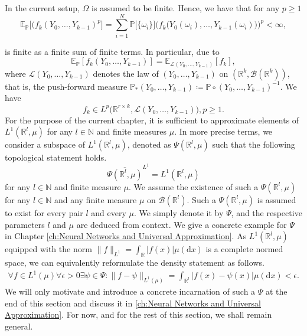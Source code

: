 \documentclass[11pt,a4paper,twoside,openany]{report}
\numberwithin{equation}{section}
\newcommand{\diff}{\mathrm{d}}
\theoremstyle{plain} %
\theoremstyle{definition} %
\theoremstyle{remark} %
\begin{document}
In the current setup, \(\Omega\) is assumed to be finite. Hence, we have that for any \(p\geq 1\)
\begin{equation*}
    \mathbb{E}_{\mathbb{P}}\big[(f_k(Y_0,\dots,Y_{k-1})^p\big]=\sum_{i=1}^N \mathbb{P}\big[\{\omega_i\}\big]\bigg(f_k\big(Y_0(\omega_i),\dots,Y_{k-1}(\omega_i)\big)\bigg)^p<\infty,
\end{equation*}

is finite as a finite sum of finite terms.
In particular, due to
\begin{equation*}
    \mathbb{E}_{\mathbb{P}}[f_k(Y_0,\dots,Y_{k-1})]=\mathbb{E}_{\mathcal{L}(Y_0,\dots,Y_{k-1})}[f_k],
\end{equation*}
where \(\mathcal{L}(Y_0,\dots,Y_{k-1})\) denotes the law of \((Y_0,\dots,Y_{k-1})\) on \((\mathbb{R}^{k},\mathcal{B}(\mathbb{R}^k))\), that is, the push-forward measure \(\mathbb{P}_*(Y_0,\dots,Y_{k-1})\coloneqq\mathbb{P}\circ(Y_0,\dots,Y_{k-1})^{-1}\). We have
\begin{equation}\label{eq:f is in Lp for finite setting}
    f_k\in L^p\big(\mathbb{R}^{r\times k},\mathcal{L}(Y_0,\dots,Y_{k-1})\big), p\geq 1.
\end{equation}
For the purpose of the current chapter, it is sufficient to approximate elements of \(L^1(\mathbb{R}^{l},\mu)\) for any \(l\in\mathbb{N}\) and finite measures \(\mu\).  
In more precise terms, we consider a subspace of \(L^1(\mathbb{R}^l,\mu)\), denoted as \(\Psi(\mathbb{R}^l,\mu)\)  such that the following topological statement holds. 
\begin{equation*}
\overline{\Psi(\mathbb{R}^l,\mu)}^{L^1}=L^1(\mathbb{R}^{l},\mu)
\end{equation*}
for any \(l\in\mathbb{N}\) and finite measure \(\mu\). We assume the existence of such a \(\Psi(\mathbb{R}^l,\mu)\) for any \(l\in\mathbb{N}\) and any finite measure \(\mu\) on \(\mathcal{B}(\mathbb{R}^l)\). Such a \(\Psi(\mathbb{R}^l,\mu)\) is assumed to exist for every pair \(l\) and every \(\mu\). We simply denote it by \(\Psi\), and the respective parameters \(l\) and \(\mu\) are deduced from context.  We give a concrete example for \(\Psi\) in Chapter \ref{ch:Neural Networks and Universal Approximation}.
As \(L^1(\mathbb{R}^l,\mu)\) equipped with the norm \(\lVert f\lVert_{L^1}=\int_\mathbb{R}|f(x)| \mu(\diff x)\) is a complete normed space, we can equivalently reformulate the density statement as follows. 
\begin{align*}
\forall f\in L^1(\mu)\forall \epsilon>0\exists \psi\in\Psi:\lVert f-\psi\rVert_{L^1(\mu)}=\int_{\mathbb{R}^{l}}|f(x)-\psi(x)| \mu(\diff x)<\epsilon.
\end{align*}
We will only motivate and introduce a concrete incarnation of such a \(\Psi\) at the end of this section and discuss it in \cref{ch:Neural Networks and Universal Approximation}. For now, and for the rest of this section, we shall remain general.
\end{document}
